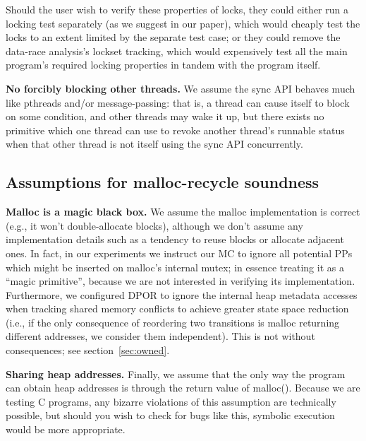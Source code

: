 \documentclass[pldi]{sigplanconf-pldi15}
\begin{document}
Should the user wish to verify these properties of locks,
they could either run a locking test separately (as we suggest in our paper),
which would cheaply test the locks to an extent limited by the separate test case;
or they could remove the data-race analysis's lockset tracking,
which would expensively test all the main program's required locking properties in tandem with the program itself.

{\bf No forcibly blocking other threads.}
We assume the sync API behaves much like pthreads and/or message-passing:
that is, a thread can cause itself to block on some condition,
and other threads may wake it up,
but there exists no primitive which one thread can use to revoke another thread's runnable status when that other thread is not itself using the sync API concurrently.

\subsection{Assumptions for malloc-recycle soundness}

{\bf Malloc is a magic black box.}
We assume the malloc implementation is correct (e.g., it won't double-allocate blocks), although we don't assume any implementation details such as a tendency to reuse blocks or allocate adjacent ones.
In fact, in our experiments we instruct our MC to ignore all potential PPs which might be inserted on malloc's internal mutex;
in essence treating it as a ``magic primitive'', because we are not interested in verifying its implementation.
Furthermore, we configured DPOR to ignore the internal heap metadata accesses
when tracking shared memory conflicts to achieve greater state space reduction
(i.e., if the only consequence of reordering two transitions is malloc returning different addresses, we consider them independent).
This is not without consequences; see section~\ref{sec:owned}.

{\bf Sharing heap addresses.}
Finally, we assume that the only way the program can obtain heap addresses is through the return value of malloc().
Because we are testing C programs, any bizarre violations of this assumption are technically possible,
but should you wish to check for bugs like this,
symbolic execution \cite{klee} would be more appropriate.
\end{document}
